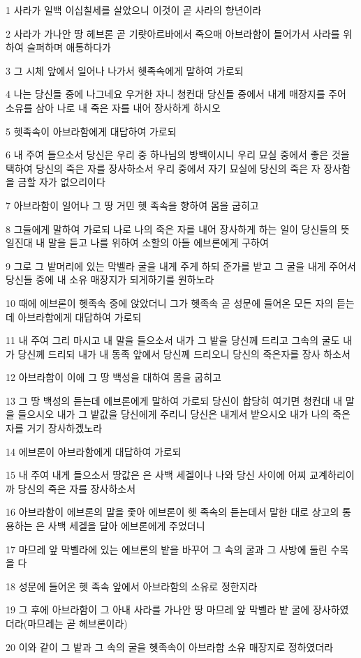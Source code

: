 \par 1 사라가 일백 이십칠세를 살았으니 이것이 곧 사라의 향년이라
\par 2 사라가 가나안 땅 헤브론 곧 기럇아르바에서 죽으매 아브라함이 들어가서 사라를 위하여 슬퍼하며 애통하다가
\par 3 그 시체 앞에서 일어나 나가서 헷족속에게 말하여 가로되
\par 4 나는 당신들 중에 나그네요 우거한 자니 청컨대 당신들 중에서 내게 매장지를 주어 소유를 삼아 나로 내 죽은 자를 내어 장사하게 하시오
\par 5 헷족속이 아브라함에게 대답하여 가로되
\par 6 내 주여 들으소서 당신은 우리 중 하나님의 방백이시니 우리 묘실 중에서 좋은 것을 택하여 당신의 죽은 자를 장사하소서 우리 중에서 자기 묘실에 당신의 죽은 자 장사함을 금할 자가 없으리이다
\par 7 아브라함이 일어나 그 땅 거민 헷 족속을 향하여 몸을 굽히고
\par 8 그들에게 말하여 가로되 나로 나의 죽은 자를 내어 장사하게 하는 일이 당신들의 뜻일진대 내 말을 듣고 나를 위하여 소할의 아들 에브론에게 구하여
\par 9 그로 그 밭머리에 있는 막벨라 굴을 내게 주게 하되 준가를 받고 그 굴을 내게 주어서 당신들 중에 내 소유 매장지가 되게하기를 원하노라
\par 10 때에 에브론이 헷족속 중에 앉았더니 그가 헷족속 곧 성문에 들어온 모든 자의 듣는데 아브라함에게 대답하여 가로되
\par 11 내 주여 그리 마시고 내 말을 들으소서 내가 그 밭을 당신께 드리고 그속의 굴도 내가 당신께 드리되 내가 내 동족 앞에서 당신께 드리오니 당신의 죽은자를 장사 하소서
\par 12 아브라함이 이에 그 땅 백성을 대하여 몸을 굽히고
\par 13 그 땅 백성의 듣는데 에브론에게 말하여 가로되 당신이 합당히 여기면 청컨대 내 말을 들으시오 내가 그 밭값을 당신에게 주리니 당신은 내게서 받으시오 내가 나의 죽은 자를 거기 장사하겠노라
\par 14 에브론이 아브라함에게 대답하여 가로되
\par 15 내 주여 내게 들으소서 땅값은 은 사백 세겔이나 나와 당신 사이에 어찌 교계하리이까 당신의 죽은 자를 장사하소서
\par 16 아브라함이 에브론의 말을 좇아 에브론이 헷 족속의 듣는데서 말한 대로 상고의 통용하는 은 사백 세겔을 달아 에브론에게 주었더니
\par 17 마므레 앞 막벨라에 있는 에브론의 밭을 바꾸어 그 속의 굴과 그 사방에 둘린 수목을 다
\par 18 성문에 들어온 헷 족속 앞에서 아브라함의 소유로 정한지라
\par 19 그 후에 아브라함이 그 아내 사라를 가나안 땅 마므레 앞 막벨라 밭 굴에 장사하였더라(마므레는 곧 헤브론이라)
\par 20 이와 같이 그 밭과 그 속의 굴을 헷족속이 아브라함 소유 매장지로 정하였더라

